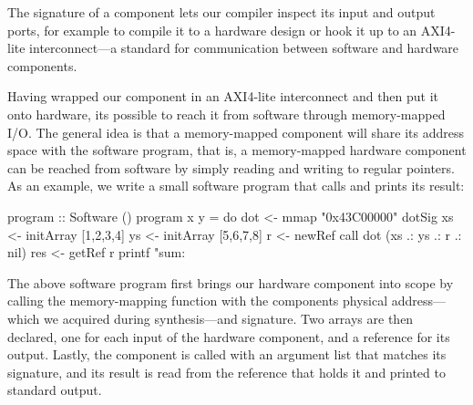 \documentclass[../paper.tex]{subfiles}
\begin{document}
\noindent The signature of a component lets our compiler inspect its input and output ports, for example to compile it to a hardware design or hook it up to an AXI4-lite interconnect---a standard for communication between software and hardware components.

Having wrapped our  component in an AXI4-lite interconnect and then put it onto hardware, its possible to reach it from software through memory-mapped I/O. The general idea is that a memory-mapped component will share its address space with the software program, that is, a memory-mapped hardware component can be reached from software by simply reading and writing to regular pointers. As an example, we write a small software program that calls  and prints its result:

\begin{code}
program :: Software ()
program x y = do
  dot <- mmap "0x43C00000" dotSig
  xs  <- initArray [1,2,3,4]
  ys  <- initArray [5,6,7,8]
  r   <- newRef
  call dot (xs .: ys .: r .: nil)
  res <- getRef r
  printf "sum: %
\end{code}

The above software program first brings our  hardware component into scope by calling the memory-mapping function  with the components physical address---which we acquired during synthesis---and signature. Two arrays are then declared, one for each input of the hardware component, and a reference for its output. Lastly, the component is called with an argument list that matches its signature, and its result is read from the reference that holds it and printed to standard output.
\end{document}
